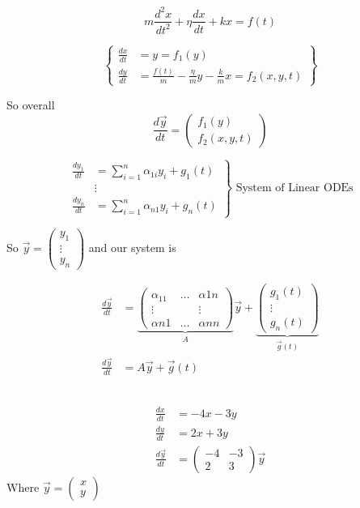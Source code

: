 \documentclass[twoside]{scrartcl}
\begin{document}
\begin{example}
\[m\frac{d^2x}{dt^2} + \eta \frac{dx}{dt} + kx = f(t)\]

\[\left\{
\begin{aligned}
  \frac{dx}{dt} &= y = f_1(y)\\
  \frac{dy}{dt} &= \frac{f(t)}{m} - \frac{\eta}{m}y  -\frac{k}{m}x = f_2(x,y,t)
\end{aligned}\right\}
\]

So overall 
\[\frac{d\vec{y}}{dt} = \begin{pmatrix}
 f_1(y) \\ f_2(x,y,t)	
 \end{pmatrix}
\]
	
\end{example}


\[\left.
\begin{aligned}
  \frac{dy_1}{dt} &= \sum_{i=1}^n \alpha_{1i}y_i + g_1(t)\\
  &\vdots\\
  \frac{dy_n}{dt} &= \sum_{i=1}^n \alpha_{n1}y_i + g_n(t)
\end{aligned}\right\}\text{ System of Linear ODEs}
\]

So $\vec{y} = \begin{pmatrix}
 y_1\\ \vdots\\ y_n	
 \end{pmatrix}$ and our system is
 
 \[\begin{aligned}
 \frac{d\vec{y}}{dt} &= \underbrace{\begin{pmatrix}
 \alpha_{11} & \dots & \alpha{1n}\\
 \vdots & & \vdots\\
 \alpha{n1} & \dots & \alpha{nn}	
 \end{pmatrix}}_{A}\vec{y} + 
\underbrace{\begin{pmatrix}
 g_1(t) \\ \vdots \\ g_n(t)	
 \end{pmatrix}}_{\vec{g}(t)}\\
 \frac{d\vec{y}}{dt} &= A\vec{y} + \vec{g}(t)
 \end{aligned}
\]~\vspace*{5pt}

\begin{example}
\[
\begin{aligned}
  \frac{dx}{dt} &= -4x - 3y\\
  \frac{dy}{dt} &= 2x + 3y\\
  \frac{d\vec{y}}{dt} &= \begin{pmatrix}
 -4 & -3 \\ 2 & 3	
 \end{pmatrix}\vec{y}
\end{aligned}
\]
Where $\vec{y} = \begin{pmatrix} x \\ y \end{pmatrix}$
\end{example}
\end{document}
